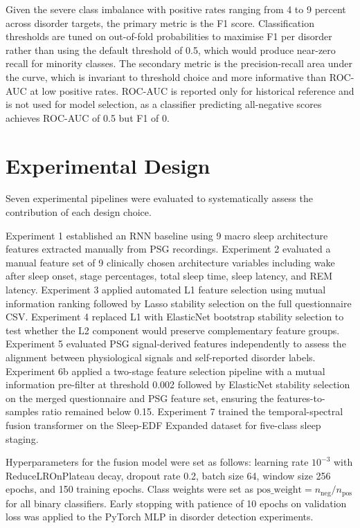 Given the severe class imbalance with positive rates ranging from 4 to 9 percent across disorder targets, the primary metric is the F1 score. Classification thresholds are tuned on out-of-fold probabilities to maximise F1 per disorder rather than using the default threshold of 0.5, which would produce near-zero recall for minority classes. The secondary metric is the precision-recall area under the curve, which is invariant to threshold choice and more informative than ROC-AUC at low positive rates. ROC-AUC is reported only for historical reference and is not used for model selection, as a classifier predicting all-negative scores achieves ROC-AUC of 0.5 but F1 of 0.

\section{Experimental Design}

Seven experimental pipelines were evaluated to systematically assess the contribution of each design choice.

Experiment 1 established an RNN baseline using 9 macro sleep architecture features extracted manually from PSG recordings. Experiment 2 evaluated a manual feature set of 9 clinically chosen architecture variables including wake after sleep onset, stage percentages, total sleep time, sleep latency, and REM latency. Experiment 3 applied automated L1 feature selection using mutual information ranking followed by Lasso stability selection on the full questionnaire CSV. Experiment 4 replaced L1 with ElasticNet bootstrap stability selection to test whether the L2 component would preserve complementary feature groups. Experiment 5 evaluated PSG signal-derived features independently to assess the alignment between physiological signals and self-reported disorder labels. Experiment 6b applied a two-stage feature selection pipeline with a mutual information pre-filter at threshold 0.002 followed by ElasticNet stability selection on the merged questionnaire and PSG feature set, ensuring the features-to-samples ratio remained below 0.15. Experiment 7 trained the temporal-spectral fusion transformer on the Sleep-EDF Expanded dataset for five-class sleep staging.

Hyperparameters for the fusion model were set as follows: learning rate $10^{-3}$ with ReduceLROnPlateau decay, dropout rate 0.2, batch size 64, window size 256 epochs, and 150 training epochs. Class weights were set as $\text{pos\_weight} = n_{\text{neg}} / n_{\text{pos}}$ for all binary classifiers. Early stopping with patience of 10 epochs on validation loss was applied to the PyTorch MLP in disorder detection experiments.

